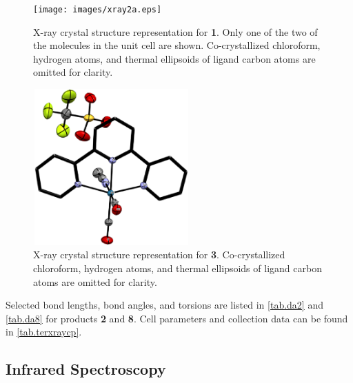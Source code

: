 \begin{figure}[!ht]
 \begin{center}
  \texttt{[image: images/xray2a.eps]}
 \end{center}
\caption[X-ray crystal structure representation for \textbf{2}.]{X-ray crystal structure representation for \textbf{1}. Only one of the two of the molecules in the unit cell are shown. Co-crystallized chloroform, hydrogen atoms, and thermal ellipsoids of ligand carbon atoms are omitted for clarity.}
\label{fig.da2}
\end{figure}

\begin{figure}[!ht]
 \begin{center}
  \includegraphics[clip=true, width=60mm, height=60mm, keepaspectratio]{images/xray8a.eps}
 \end{center}
\caption[X-ray crystal structure representation for \textbf{8}.]{X-ray crystal structure representation for \textbf{3}. Co-crystallized chloroform, hydrogen atoms, and thermal ellipsoids of ligand carbon atoms are omitted for clarity.}
\label{fig.da8}
\end{figure}

Selected bond lengths, bond angles, and torsions are listed in \autoref{tab.da2} and \autoref{tab.da8} for products \textbf{2} and \textbf{8}. Cell parameters and collection data can be found in \autoref{tab.terxraycp}. 





\FloatBarrier

\subsection{Infrared Spectroscopy}

